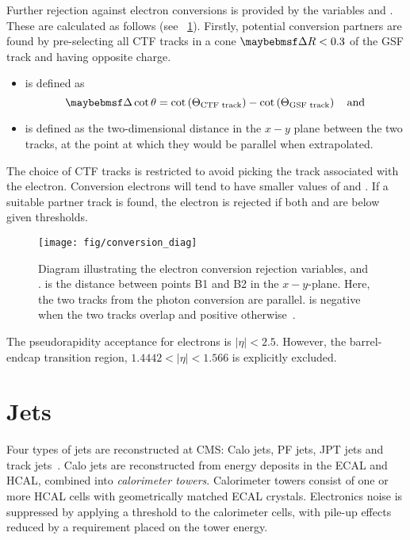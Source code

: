 Further rejection against electron conversions is provided by the variables
\Distnm and \DeltaCotThetanm. These are calculated as follows (see
\fig~\ref{fig:conversion_diag}). Firstly, potential conversion partners are
found by pre-selecting all \ac{CTF} tracks in a cone $\DeltaR < 0.3$ of the
\ac{GSF} track and having opposite charge.
\begin{itemize}
\item \DeltaCotThetanm is defined as
\begin{equation*}
  \DeltaCotThetanm = \cot\left(\Theta_{\textrm{CTF track}}\right) - \cot\left(\Theta_{\textrm{GSF track}}\right)\quad\textrm{and}
\end{equation*}
\item \Distnm is defined as the two-dimensional distance in the $x-y$ plane
  between the two tracks, at the point at which they would be parallel when
  extrapolated.
\end{itemize}
The choice of \ac{CTF} tracks is restricted to avoid picking the track
associated with the electron. Conversion electrons will tend to have smaller
values of \DeltaCotTheta and \Dist. If a suitable partner track is found, the
electron is rejected if both \Dist and \DeltaCotTheta are below given
thresholds.

\begin{figure}[h!]
  \centering
  \texttt{[image: fig/conversion\_diag]}
  \caption[Diagram illustrating electron conversion rejection variables]{Diagram
    illustrating the electron conversion rejection variables, \Distnm and
    \DeltaCotThetanm. \Distnm is the distance between points B1 and B2 in the
    $x-y$-plane. Here, the two tracks from the photon conversion are
    parallel. \Distnm is negative when the two tracks overlap and positive
    otherwise~\cite{cms_an_2009_159}.}
  \label{fig:conversion_diag}
\end{figure}

The pseudorapidity acceptance for electrons is $|\eta| < 2.5$. However, the
barrel-endcap transition region, $1.4442 < |\eta| < 1.566$ is explicitly excluded.



\section{Jets}
\label{sec:reco_jets}
Four types of jets are reconstructed at \ac{CMS}: \acf{Calo} jets, \ac{PF} jets,
\ac{JPT} jets and track jets~\cite{jet_perf_pas}. \ac{Calo} jets are
reconstructed from energy deposits in the \ac{ECAL} and \ac{HCAL}, combined into
\emph{calorimeter towers}. Calorimeter towers consist of one or more \ac{HCAL} cells
with geometrically matched \ac{ECAL} crystals. Electronics noise is suppressed
by applying a threshold to the calorimeter cells, with pile-up effects reduced
by a requirement placed on the tower energy.

